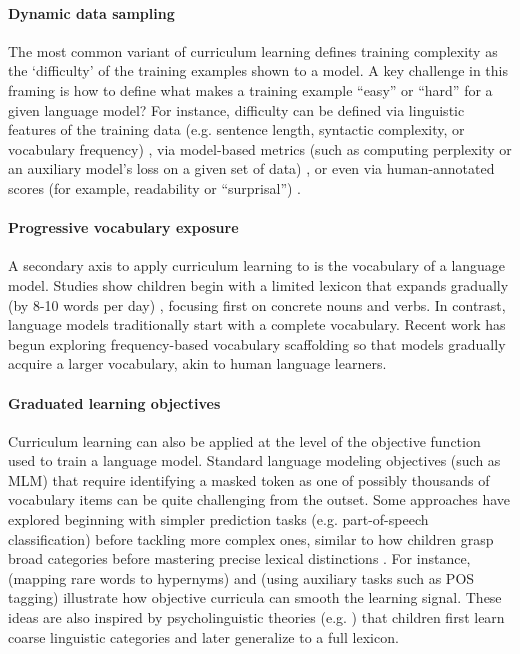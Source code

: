 \paragraph{Dynamic data sampling} The most common variant of curriculum learning defines training complexity as the `difficulty' of the training examples shown to a model. A key challenge in this framing is how to define what makes a training example “easy” or “hard” for a given language model?  For instance, difficulty can be defined via linguistic features of the training data (e.g. sentence length, syntactic complexity, or vocabulary frequency) \citet{campos2021curriculum, kocmi2017curriculum, liu2018curriculum}, via model-based metrics (such as computing perplexity or an auxiliary model's loss on a given set of data) \citet{sachan2016easy, lalor2020dynamic}, or even via human-annotated scores (for example, readability or “surprisal”) \citep{soviany2022curriculum}. 

\paragraph{Progressive vocabulary exposure} A secondary axis to apply curriculum learning to is the vocabulary of a language model. Studies show children begin with a limited lexicon that expands gradually (by 8-10 words per day) \citep{fenson1994variability, bergelson2015early, weizman2001lexical}, focusing first on concrete nouns and verbs. In contrast, language models traditionally start with a complete vocabulary. Recent work has begun exploring frequency-based vocabulary scaffolding \citep{soviany2022curriculum} so that models gradually acquire a larger vocabulary, akin to human language learners. 

\paragraph{Graduated learning objectives} Curriculum learning can also be applied at the level of the objective function used to train a language model. Standard language modeling objectives (such as MLM) that require identifying a masked token as one of possibly thousands of vocabulary items can be quite challenging from the outset. Some approaches have explored beginning with simpler prediction tasks (e.g. part-of-speech classification) before tackling more complex ones, similar to how children grasp broad categories before mastering precise lexical distinctions \citep{markman1990constraints}. For instance, \citet{bai2022better} (mapping rare words to hypernyms) and \citet{wang2023language, cui2022lert} (using auxiliary tasks such as POS tagging) illustrate how objective curricula can smooth the learning signal. These ideas are also inspired by psycholinguistic theories (e.g. \citet{alishahi2010computational, gleitman1990structural}) that children first learn coarse linguistic categories and later generalize to a full lexicon.

